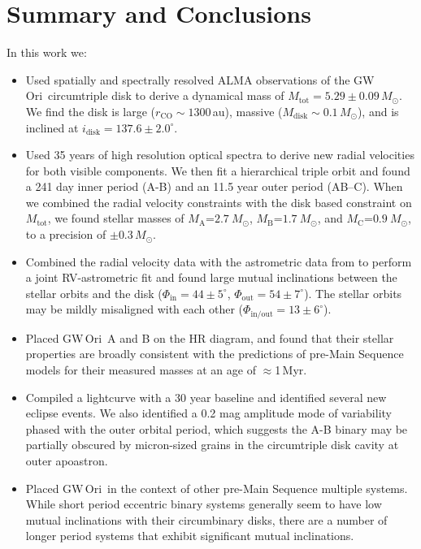 \documentclass[twocolumn]{aastex61}
\newcommand{\obj}{GW\,Ori}
\begin{document}
\section{Summary and Conclusions} \label{sec:summary}
In this work we:
\begin{itemize}
\item Used spatially and spectrally resolved ALMA observations of the \obj\ circumtriple disk to derive a dynamical mass of $M_\mathrm{tot} = 5.29 \pm 0.09\,M_\odot$. We find the disk is large ($r_\mathrm{CO} \sim 1300\,$au), massive ($M_\mathrm{disk} \sim 0.1\,M_\odot$), and is inclined at $i_\mathrm{disk} = 137.6\pm2.0^\circ$.
\item Used 35 years of high resolution optical spectra to derive new radial velocities for both visible components. We then fit a hierarchical triple orbit and found a 241 day inner period (A-B) and an 11.5 year outer period (AB--C). When we combined the radial velocity constraints with the disk based constraint on $M_\mathrm{tot}$, we found stellar masses of $M_\mathrm{A}$=$2.7~M_\odot$, $M_\mathrm{B}$=$1.7~M_\odot$, and $M_\mathrm{C}$=$0.9~M_\odot$, to a precision of $\pm 0.3\,M_\odot$.
\item Combined the radial velocity data with the astrometric data from \citet{berger11} to perform a joint RV-astrometric fit and found large mutual inclinations between the stellar orbits and the disk ($\Phi_\mathrm{in} = 44\pm5^\circ$, $\Phi_\mathrm{out} = 54 \pm 7^\circ$). The stellar orbits may be mildly misaligned with each other ($\Phi_\mathrm{in/out} = 13 \pm 6^\circ$).
\item Placed \obj~A and B on the HR diagram, and found that their stellar properties are broadly consistent with the predictions of pre-Main Sequence models for their measured masses at an age of $\approx$1\,Myr.
\item Compiled a lightcurve with a 30 year baseline and identified several new eclipse events. We also identified a 0.2 mag amplitude mode of variability phased with the outer orbital period, which suggests the A-B binary may be partially obscured by micron-sized grains in the circumtriple disk cavity at outer apoastron.
\item Placed \obj\ in the context of other pre-Main Sequence multiple systems. While short period eccentric binary systems generally seem to have low mutual inclinations with their circumbinary disks, there are a number of longer period systems that exhibit significant mutual inclinations.
\end{itemize}
\end{document}
